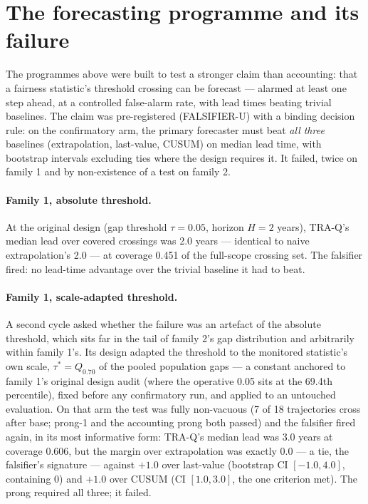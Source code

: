 \documentclass[11pt]{article}
\begin{document}
\section{The forecasting programme and its failure}
\label{sec:forecasting}

The programmes above were built to test a stronger claim than
accounting: that a fairness statistic's threshold crossing can be
forecast --- alarmed at least one step ahead, at a controlled
false-alarm rate, with lead times beating trivial baselines. The
claim was pre-registered (FALSIFIER-U) with a binding decision
rule: on the confirmatory arm, the primary forecaster must beat
\emph{all three} baselines (extrapolation, last-value, CUSUM) on
median lead time, with bootstrap intervals excluding ties where the
design requires it. It failed, twice on family 1 and by
non-existence of a test on family 2.

\paragraph{Family 1, absolute threshold.} At the original design
(gap threshold $\tau = 0.05$, horizon $H = 2$ years), TRA-Q's median
lead over covered crossings was 2.0 years --- identical to naive
extrapolation's 2.0 --- at coverage 0.451 of the full-scope
crossing set. The falsifier fired: no lead-time advantage over the
trivial baseline it had to beat.

\paragraph{Family 1, scale-adapted threshold.} A second cycle asked
whether the failure was an artefact of the absolute threshold,
which sits far in the tail of family 2's gap distribution and
arbitrarily within family 1's. Its design adapted the threshold to
the monitored statistic's own scale,
$\tau^* = Q_{0.70}$ of the pooled population gaps --- a constant
anchored to family 1's original design audit (where the operative
0.05 sits at the 69.4th percentile), fixed before any confirmatory
run, and applied to an untouched evaluation. On that arm the test
was fully non-vacuous (7 of 18 trajectories cross after base;
prong-1 and the accounting prong both passed) and the falsifier
fired again, in its most informative form: TRA-Q's median lead was
3.0 years at coverage 0.606, but the margin over extrapolation was
exactly $0.0$ --- a tie, the falsifier's signature --- against
$+1.0$ over last-value (bootstrap CI $[-1.0, 4.0]$, containing 0)
and $+1.0$ over CUSUM (CI $[1.0, 3.0]$, the one criterion met).
The prong required all three; it failed.
\end{document}
